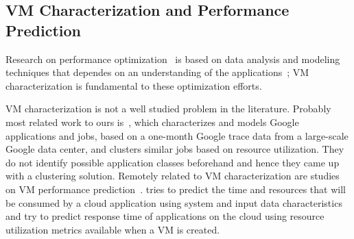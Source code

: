 \subsection{VM Characterization and Performance Prediction}


Research on performance optimization~\cite{Yang2005,Matsunaga2010,OguraM10}
is based on data analysis and modeling techniques that dependes on an understanding of the applications~\cite{Shan2008}; VM characterization is fundamental to these optimization efforts. 

VM characterization is not a well studied problem in the literature. Probably most related work to ours is~\cite{Derrick2014}, which characterizes and models Google applications and jobs, based on a one-month Google trace data from a large-scale Google data center, and clusters similar jobs based on resource utilization. They do not identify possible application classes beforehand and hence they came up with a clustering solution. Remotely related to VM characterization are studies on VM performance prediction~\cite{Matsunaga2010, Samuel2013}. \cite{Matsunaga2010} tries to predict the time and resources that will be consumed by a cloud application using system and input data characteristics and \cite{Samuel2013} try to predict response time of applications on the cloud using resource utilization metrics available when a VM is created. 

